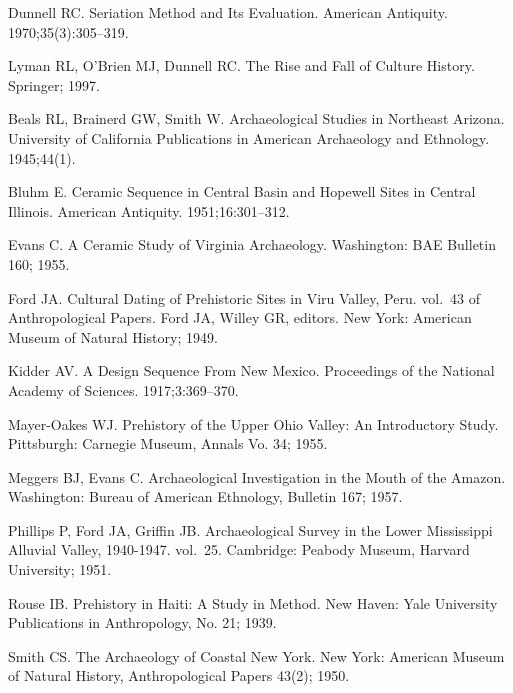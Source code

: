 \documentclass[10pt,letterpaper]{article}
\begin{document}
%

\begin{thebibliography}{10}

Dunnell RC.
\newblock Seriation Method and Its Evaluation.
\newblock American Antiquity. 1970;35(3):305--319.

Lyman RL, O'Brien MJ, Dunnell RC.
\newblock The Rise and Fall of Culture History.
\newblock Springer; 1997.

Beals RL, Brainerd GW, Smith W.
\newblock Archaeological Studies in Northeast Arizona.
\newblock University of California Publications in American Archaeology and
  Ethnology. 1945;44(1).

Bluhm E.
\newblock Ceramic Sequence in Central Basin and Hopewell Sites in Central
  Illinois.
\newblock American Antiquity. 1951;16:301--312.

Evans C.
\newblock A Ceramic Study of Virginia Archaeology.
\newblock Washington: BAE Bulletin 160; 1955.

Ford JA.
\newblock Cultural Dating of Prehistoric Sites in Viru Valley, Peru. vol.~43 of
  Anthropological Papers.
\newblock Ford JA, Willey GR, editors. New York: American Museum of Natural
  History; 1949.

Kidder AV.
\newblock A Design Sequence From New Mexico.
\newblock Proceedings of the National Academy of Sciences. 1917;3:369--370.

Mayer-Oakes WJ.
\newblock Prehistory of the Upper Ohio Valley: An Introductory Study.
\newblock Pittsburgh: Carnegie Museum, Annals Vo. 34; 1955.

Meggers BJ, Evans C.
\newblock Archaeological Investigation in the Mouth of the Amazon.
\newblock Washington: Bureau of American Ethnology, Bulletin 167; 1957.

Phillips P, Ford JA, Griffin JB.
\newblock Archaeological Survey in the Lower Mississippi Alluvial Valley,
  1940-1947. vol.~25.
\newblock Cambridge: Peabody Museum, Harvard University; 1951.

Rouse IB.
\newblock Prehistory in Haiti: A Study in Method.
\newblock New Haven: Yale University Publications in Anthropology, No. 21;
  1939.

Smith CS.
\newblock The Archaeology of Coastal New York.
\newblock New York: American Museum of Natural History, Anthropological Papers
  43(2); 1950.


\end{thebibliography}
\end{document}
